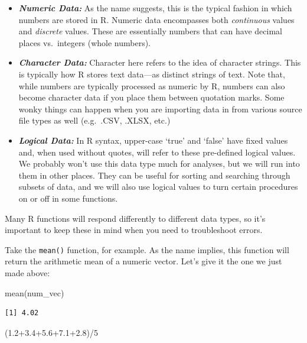 \documentclass[
  letterpaper,
  DIV=11,
  numbers=noendperiod]{scrreprt}
\newenvironment{Shaded}{\begin{snugshade}}{\end{snugshade}}
\newcommand{\DecValTok}[1]{\textcolor[rgb]{0.68,0.00,0.00}{#1}}
\newcommand{\FloatTok}[1]{\textcolor[rgb]{0.68,0.00,0.00}{#1}}
\newcommand{\FunctionTok}[1]{\textcolor[rgb]{0.28,0.35,0.67}{#1}}
\newcommand{\NormalTok}[1]{\textcolor[rgb]{0.00,0.23,0.31}{#1}}
\newcommand{\SpecialCharTok}[1]{\textcolor[rgb]{0.37,0.37,0.37}{#1}}
\begin{document}
\begin{itemize}
\item
  \textbf{\emph{Numeric Data:}} As the name suggests, this is the
  typical fashion in which numbers are stored in R. Numeric data
  encompasses both \emph{continuous} values and \emph{discrete} values.
  These are essentially numbers that can have decimal places
  vs.~integers (whole numbers).
\item
  \textbf{\emph{Character Data:}} Character here refers to the idea of
  character strings. This is typically how R stores text data---as
  distinct strings of text. Note that, while numbers are typically
  processed as numeric by R, numbers can also become character data if
  you place them between quotation marks. Some wonky things can happen
  when you are importing data in from various source file types as well
  (e.g.~.CSV, .XLSX, etc.)
\item
  \textbf{\emph{Logical Data:}} In R syntax, upper-case `true' and
  `false' have fixed values and, when used without quotes, will refer to
  these pre-defined logical values. We probably won't use this data type
  much for analyses, but we will run into them in other places. They can
  be useful for sorting and searching through subsets of data, and we
  will also use logical values to turn certain procedures on or off in
  some functions.
\end{itemize}

Many R functions will respond differently to different data types, so
it's important to keep these in mind when you need to troubleshoot
errors.

Take the \texttt{mean()} function, for example. As the name implies,
this function will return the arithmetic mean of a numeric vector. Let's
give it the one we just made above:

\begin{Shaded}
\begin{Highlighting}[]
\FunctionTok{mean}\NormalTok{(num\_vec)}
\end{Highlighting}
\end{Shaded}

\begin{verbatim}
[1] 4.02
\end{verbatim}

\begin{Shaded}
\begin{Highlighting}[]
\NormalTok{(}\FloatTok{1.2+3.4+5.6+7.1+2.8}\NormalTok{)}\SpecialCharTok{/}\DecValTok{5}
\end{Highlighting}
\end{Shaded}
\end{document}
